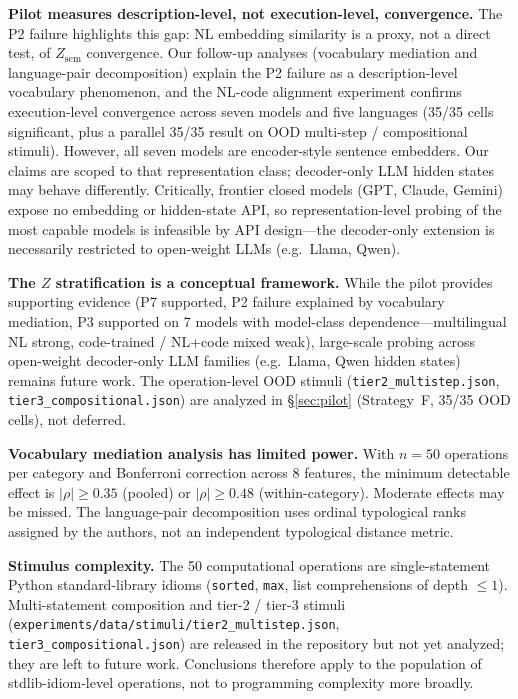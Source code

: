 \documentclass[11pt]{article}
\theoremstyle{definition}
\newcommand{\Zsem}{Z_{\text{sem}}}
\begin{document}
\textbf{Pilot measures description-level, not execution-level, convergence.} The P2 failure highlights this gap: NL embedding similarity is a proxy, not a direct test, of $\Zsem$ convergence. Our follow-up analyses (vocabulary mediation and language-pair decomposition) explain the P2 failure as a description-level vocabulary phenomenon, and the NL-code alignment experiment confirms execution-level convergence across seven models and five languages (35/35 cells significant, plus a parallel 35/35 result on OOD multi-step / compositional stimuli). However, all seven models are encoder-style sentence embedders. Our claims are scoped to that representation class; decoder-only LLM hidden states may behave differently. Critically, frontier closed models (GPT, Claude, Gemini) expose no embedding or hidden-state API, so representation-level probing of the most capable models is infeasible by API design---the decoder-only extension is necessarily restricted to open-weight LLMs (e.g.\ Llama, Qwen).

\textbf{The $Z$ stratification is a conceptual framework.} While the pilot provides supporting evidence (P7 supported, P2 failure explained by vocabulary mediation, P3 supported on 7 models with model-class dependence---multilingual NL strong, code-trained / NL+code mixed weak), large-scale probing across open-weight decoder-only LLM families (e.g.\ Llama, Qwen hidden states) remains future work. The operation-level OOD stimuli (\texttt{tier2\_multistep.json}, \texttt{tier3\_compositional.json}) are analyzed in \S\ref{sec:pilot} (Strategy~F, 35/35 OOD cells), not deferred.

\textbf{Vocabulary mediation analysis has limited power.} With $n=50$ operations per category and Bonferroni correction across 8 features, the minimum detectable effect is $|\rho| \geq 0.35$ (pooled) or $|\rho| \geq 0.48$ (within-category). Moderate effects may be missed. The language-pair decomposition uses ordinal typological ranks assigned by the authors, not an independent typological distance metric.

\textbf{Stimulus complexity.} The 50 computational operations are single-statement Python standard-library idioms (\texttt{sorted}, \texttt{max}, list comprehensions of depth $\leq 1$). Multi-statement composition and tier-2 / tier-3 stimuli (\texttt{experiments/data/stimuli/tier2\_multistep.json}, \texttt{tier3\_compositional.json}) are released in the repository but not yet analyzed; they are left to future work. Conclusions therefore apply to the population of stdlib-idiom-level operations, not to programming complexity more broadly.
\end{document}
